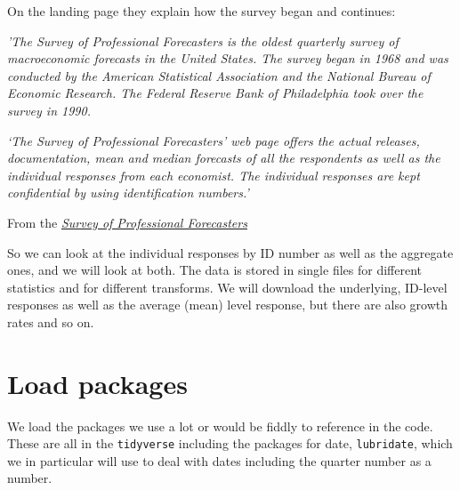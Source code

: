 \documentclass[
  letterpaper,
]{book}
\begin{document}
\begin{tcolorbox}[enhanced jigsaw, breakable, left=2mm, arc=.35mm, toptitle=1mm, colbacktitle=quarto-callout-note-color!10!white, opacityback=0, bottomrule=.15mm, leftrule=.75mm, opacitybacktitle=0.6, title=\textcolor{quarto-callout-note-color}{\faInfo}\hspace{0.5em}{The SPF}, colframe=quarto-callout-note-color-frame, coltitle=black, titlerule=0mm, toprule=.15mm, bottomtitle=1mm, rightrule=.15mm, colback=white]

On the landing page they explain how the survey began and continues:

\emph{'The Survey of Professional Forecasters is the oldest quarterly
survey of macroeconomic forecasts in the United States. The survey began
in 1968 and was conducted by the American Statistical Association and
the National Bureau of Economic Research. The Federal Reserve Bank of
Philadelphia took over the survey in 1990.}

\emph{`The Survey of Professional Forecasters' web page offers the
actual releases, documentation, mean and median forecasts of all the
respondents as well as the individual responses from each economist. The
individual responses are kept confidential by using identification
numbers.'}

From the
\href{https://www.philadelphiafed.org/research-and-data/real-time-center/survey-of-professional-forecasters}{\emph{Survey
of Professional Forecasters}}

\end{tcolorbox}

So we can look at the individual responses by ID number as well as the
aggregate ones, and we will look at both. The data is stored in single
files for different statistics and for different transforms. We will
download the underlying, ID-level responses as well as the average
(mean) level response, but there are also growth rates and so on.

\hypertarget{load-packages}{%
\section{Load packages}\label{load-packages}}

We load the packages we use a lot or would be fiddly to reference in the
code. These are all in the \texttt{tidyverse} including the packages for
date, \texttt{lubridate}, which we in particular will use to deal with
dates including the quarter number as a number.
\end{document}

